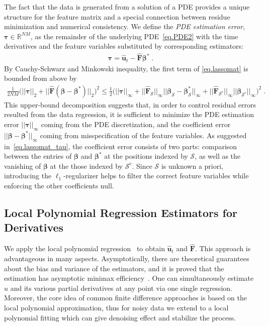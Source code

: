 \documentclass[a4paper,11pt]{article}
\newcommand{\btau}{\bm{\tau}}
\newcommand{\bbeta}{\bm{\beta}}
\newcommand{\bF}{\mathbf{F}}
\newcommand{\mS}{\mathcal{S}}
\newcommand{\bu}{\mathbf{u}}
\theoremstyle{definition}
\begin{document}
The fact that the data is generated from a solution of a PDE provides a unique structure for the feature matrix and a special connection between residue minimization and numerical consistency.  We define the \textit{PDE estimation error}, $\btau\in\mathbb{R}^{NM}$, as the remainder of the underlying PDE~\eqref{eq.PDE2} with the time derivatives and the feature variables substituted by corresponding estimators:
\begin{align}
\btau=\widehat{\bu}_t-\widehat{\bF}\bbeta^*\;.\label{eq.tau}
\end{align}
By Cauchy-Schwarz and Minkowski inequality, the first term of \eqref{eq.lassomat} is bounded from above by
\begin{align}
\frac{1}{2NM}\big(||\btau||_2+||\widehat{\bF}(\bbeta-\bbeta^*)||_2\big)^2\leq \frac{1}{2}\big(||\btau||_\infty+||\widehat{\bF}_\mS||_\infty||\bbeta_\mS-\bbeta_\mS^*||_\infty+||\widehat{\bF}_{\mS^c}||_\infty||\bbeta_{\mS^c}||_\infty\big)^2\;.\label{eq.lassomat_tau}	
\end{align}
%
This upper-bound decomposition suggests that, in order to control residual errors resulted from the data regression, it is sufficient to minimize the PDE estimation error $||\btau||_\infty$  coming from the PDE discretization, and the coefficient error $||\bbeta-\bbeta^*||_\infty$ coming from misspecification of the feature variables. As suggested in~\eqref{eq.lassomat_tau}, the coefficient error consists of two parts: comparison between the entries of $\bbeta$ and $\bbeta^*$ at the positions indexed by $\mS$, as well as the vanishing of $\bbeta$ at the those indexed by $\mS^c$. Since $\mS$ is unknown a priori, introducing the $\ell_1$-regularizer helps to filter  the correct feature variables while enforcing the other coefficients null.


\subsection{Local Polynomial Regression Estimators for Derivatives}\label{ssec:local}


We apply the local polynomial regression~\cite{fan1997local} to obtain $\widehat{\bu}_t$ and $\widehat{\bF}$. This approach is advantageous in many aspects. Asymptotically, there are theoretical guarantees about the bias and variance of the estimators, and it is proved that the estimation has asymptotic minimax efficiency~\cite{fan1997local}.  One can simultaneously estimate $u$ and its various partial derivatives at any point via one single regression.  Moreover,  the core idea of common finite difference approaches is based on the local polynomial approximation, thus for noisy data we extend to a local polynomial fitting which can give denoising effect and stabilize the process.
\end{document}
